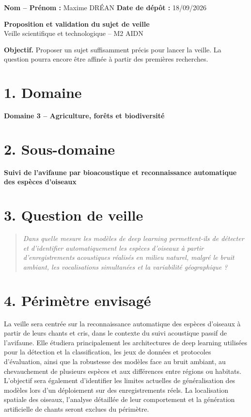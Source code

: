 \documentclass[11pt,a4paper]{article}
\begin{document}
\textbf{Nom -- Prénom :} Maxime DRÉAN \hfill
\textbf{Date de dépôt :} 18/09/2026

\vspace{0.8cm}

\begin{center}
    {\Large \textbf{Proposition et validation du sujet de veille}}\\[0.15cm]
    {\normalsize Veille scientifique et technologique -- M2 AIDN}
\end{center}

\vspace{0.55cm}

\textbf{Objectif.} Proposer un sujet suffisamment précis pour lancer la veille. La question pourra encore être affinée à partir des premières recherches.

\section*{1. Domaine}
\textbf{Domaine 3 -- Agriculture, forêts et biodiversité}

\section*{2. Sous-domaine}
\textbf{Suivi de l'avifaune par bioacoustique et reconnaissance automatique des espèces d'oiseaux}

\section*{3. Question de veille}
\begin{quote}
\textit{Dans quelle mesure les modèles de deep learning permettent-ils de détecter et d'identifier automatiquement les espèces d'oiseaux à partir d'enregistrements acoustiques réalisés en milieu naturel, malgré le bruit ambiant, les vocalisations simultanées et la variabilité géographique ?}
\end{quote}

\section*{4. Périmètre envisagé}
La veille sera centrée sur la reconnaissance automatique des espèces d'oiseaux à partir de leurs chants et cris, dans le contexte du suivi acoustique passif de l'avifaune. Elle étudiera principalement les architectures de deep learning utilisées pour la détection et la classification, les jeux de données et protocoles d'évaluation, ainsi que la robustesse des modèles face au bruit ambiant, au chevauchement de plusieurs espèces et aux différences entre régions ou habitats. L'objectif sera également d'identifier les limites actuelles de généralisation des modèles lors d'un déploiement sur des enregistrements réels. La localisation spatiale des oiseaux, l'analyse détaillée de leur comportement et la génération artificielle de chants seront exclues du périmètre.
\end{document}
